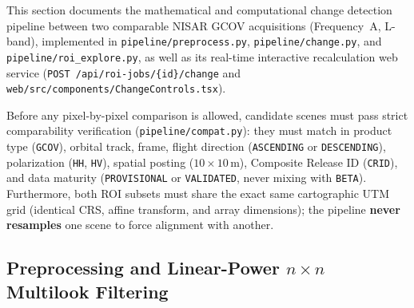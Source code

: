 \documentclass[11pt,a4paper]{article}
\newcommand{\src}[1]{\nolinkurl{#1}}
\newcommand{\unit}[1]{\mathrm{#1}}
\begin{document}
This section documents the mathematical and computational change detection pipeline between two comparable NISAR GCOV acquisitions (Frequency~A, L-band), implemented in \src{pipeline/preprocess.py}, \src{pipeline/change.py}, and \src{pipeline/roi_explore.py}, as well as its real-time interactive recalculation web service (\texttt{POST /api/roi-jobs/\{id\}/change} and \src{web/src/components/ChangeControls.tsx}).

Before any pixel-by-pixel comparison is allowed, candidate scenes must pass strict comparability verification (\src{pipeline/compat.py}): they must match in product type (\texttt{GCOV}), orbital track, frame, flight direction (\texttt{ASCENDING} or \texttt{DESCENDING}), polarization (\texttt{HH}, \texttt{HV}), spatial posting ($10\times 10\,\unit{m}$), Composite Release ID (\texttt{CRID}), and data maturity (\texttt{PROVISIONAL} or \texttt{VALIDATED}, never mixing with \texttt{BETA}). Furthermore, both ROI subsets must share the exact same cartographic UTM grid (identical CRS, affine transform, and array dimensions); the pipeline \textbf{never resamples} one scene to force alignment with another.

\subsection{Preprocessing and Linear-Power $n\times n$ Multilook Filtering}
\label{subsec:cambio-multilook}
\end{document}
